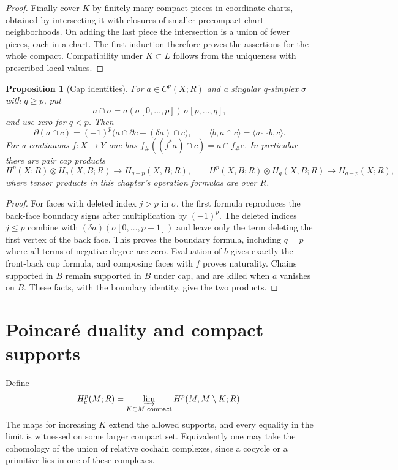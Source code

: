 \documentclass[11pt,oneside,openany]{book}
\theoremstyle{plain}
\newtheorem{proposition}[theorem]{Proposition}
\theoremstyle{definition}
\theoremstyle{remark}
\begin{document}
\begin{proof}
Finally cover \(K\) by finitely many compact pieces in
coordinate charts, obtained by intersecting it with closures
of smaller precompact chart neighborhoods. On adding the last
piece the intersection is a union of fewer pieces, each in a
chart. The first induction therefore proves the assertions
for the whole compact. Compatibility under \(K\subset L\)
follows from the uniqueness with prescribed local values.
\end{proof}

\begin{proposition}[Cap identities]\label{prop:p202-cap}
For \(a\in C^p(X;R)\) and a singular \(q\)-simplex \(\sigma\)
with \(q\ge p\), put
\[
 a\cap \sigma=a(\sigma[0,\ldots,p])\,\sigma[p,\ldots,q],
\]
and use zero for \(q<p\). Then
\[
 \partial(a\cap c)=(-1)^p\bigl(a\cap\partial c-(\delta a)\cap c\bigr),
 \qquad
 \langle b,a\cap c\rangle=\langle a\smile b,c\rangle .
\]
For a continuous \(f:X\to Y\) one has
\(f_\#((f^*a)\cap c)=a\cap f_\#c\).
In particular there are pair cap products
\[
 H^p(X;R)\otimes H_q(X,B;R)\to H_{q-p}(X,B;R),
 \qquad
 H^p(X,B;R)\otimes H_q(X,B;R)\to H_{q-p}(X;R),
\]
where tensor products in this chapter's operation formulas
are over \(R\).
\end{proposition}
\begin{proof}
For faces with deleted index \(j>p\) in \(\sigma\), the
first formula reproduces the back-face boundary signs after
multiplication by \((-1)^p\). The deleted indices \(j\le p\)
combine with \((\delta a)(\sigma[0,\ldots,p+1])\) and leave
only the term deleting the first vertex of the back face.
This proves the boundary formula, including \(q=p\) where
all terms of negative degree are zero. Evaluation of \(b\)
gives exactly the front-back cup formula, and composing
faces with \(f\) proves naturality. Chains supported in \(B\)
remain supported in \(B\) under cap, and are killed when
\(a\) vanishes on \(B\). These facts, with the boundary
identity, give the two products.
\end{proof}

\section{Poincar\'e duality and compact supports}\label{p202:T30}

Define
\[
 H_c^p(M;R)=\varinjlim_{K\subset M\text{ compact}}
                       H^p(M,M\setminus K;R).
\]
The maps for increasing \(K\) extend the allowed supports,
and every equality in the limit is witnessed on some larger
compact set. Equivalently one may take the cohomology of the
union of relative cochain complexes, since a cocycle or a
primitive lies in one of these complexes.
\end{document}
